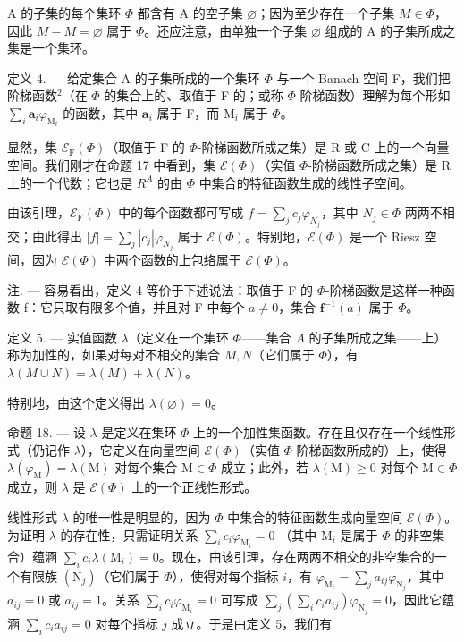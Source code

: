A 的子集的每个集环 \(\Phi\) 都含有 A 的空子集 \(\varnothing\)；因为至少存在一个子集 \(M \in \Phi\)，因此 \(M - M = \varnothing\) 属于 \(\Phi\)。还应注意，由单独一个子集 \(\varnothing\) 组成的 A 的子集所成之集是一个集环。

定义 4. --- 给定集合 A 的子集所成的一个集环 \(\Phi\) 与一个 Banach 空间 F，我们把阶梯函数\(^{2}\)（在 \(\Phi\) 的集合上的、取值于 F 的；或称 \(\Phi\)-阶梯函数）理解为每个形如 \(\sum_{i} \mathbf{a}_{i} \varphi_{\mathrm{M}_{i}}\) 的函数，其中 \(\mathbf{a}_{i}\) 属于 F，而 \(\mathrm{M}_{i}\) 属于 \(\Phi\)。

显然，集 \(\mathcal{E}_{\mathrm{F}}(\Phi)\)（取值于 F 的 \(\Phi\)-阶梯函数所成之集）是 R 或 C 上的一个向量空间。我们刚才在命题 17 中看到，集 \(\mathcal{E}(\Phi)\)（实值 \(\Phi\)-阶梯函数所成之集）是 R 上的一个代数；它也是 \(R^{A}\) 的由 \(\Phi\) 中集合的特征函数生成的线性子空间。

由该引理，\(\mathcal{E}_{\mathrm{F}}(\Phi)\) 中的每个函数都可写成 \(f = \sum_{j} c_{j} \varphi_{N_{j}}\)，其中 \(N_{j} \in \Phi\) 两两不相交；由此得出 \(|f| = \sum_{j} |c_{j}| \varphi_{N_{j}}\) 属于 \(\mathcal{E}(\Phi)\)。特别地，\(\mathcal{E}(\Phi)\) 是一个 Riesz 空间，因为 \(\mathcal{E}(\Phi)\) 中两个函数的上包络属于 \(\mathcal{E}(\Phi)\)。

注. --- 容易看出，定义 4 等价于下述说法：取值于 F 的 \(\Phi\)-阶梯函数是这样一种函数 f：它只取有限多个值，并且对 F 中每个 \(a \neq 0\)，集合 \(\mathbf{f}^{-1}(a)\) 属于 \(\Phi\)。

定义 5. --- 实值函数 \(\lambda\)（定义在一个集环 \(\Phi\)——集合 \(A\) 的子集所成之集——上）称为加性的，如果对每对不相交的集合 \(M, N\)（它们属于 \(\Phi\)），有 \(\lambda(M \cup N) = \lambda(M) + \lambda(N)\)。

特别地，由这个定义得出 \(\lambda(\varnothing)=0\)。

命题 18. --- 设 \(\lambda\) 是定义在集环 \(\Phi\) 上的一个加性集函数。存在且仅存在一个线性形式（仍记作 \(\lambda\)），它定义在向量空间 \(\mathcal{E}(\Phi)\)（实值 \(\Phi\)-阶梯函数所成的）上，使得 \(\lambda(\varphi_{\mathrm{M}}) = \lambda(\mathrm{M})\) 对每个集合 \(\mathrm{M} \in \Phi\) 成立；此外，若 \(\lambda(\mathrm{M}) \geqslant 0\) 对每个 \(\mathrm{M} \in \Phi\) 成立，则 \(\lambda\) 是 \(\mathcal{E}(\Phi)\) 上的一个正线性形式。

线性形式 \(\lambda\) 的唯一性是明显的，因为 \(\Phi\) 中集合的特征函数生成向量空间 \(\mathcal{E}(\Phi)\)。为证明 \(\lambda\) 的存在性，只需证明关系 \(\sum_{i} c_i \varphi_{\mathrm{M}_i} = 0\) （其中 \(\mathrm{M}_i\) 是属于 \(\Phi\) 的非空集合）蕴涵 \(\sum_{i} c_i \lambda(\mathrm{M}_i) = 0\)。现在，由该引理，存在两两不相交的非空集合的一个有限族 \((\mathrm{N}_j)\)（它们属于 \(\Phi\)），使得对每个指标 \(i\)，有 \(\varphi_{\mathrm{M}_i} = \sum_{j} a_{ij} \varphi_{\mathrm{N}_j}\)，其中 \(a_{ij} = 0\) 或 \(a_{ij} = 1\)。关系 \(\sum_{i} c_i \varphi_{\mathrm{M}_i} = 0\) 可写成 \(\sum_{j} \left( \sum_{i} c_i a_{ij} \right) \varphi_{\mathrm{N}_j} = 0\)，因此它蕴涵 \(\sum_{i} c_i a_{ij} = 0\) 对每个指标 \(j\) 成立。于是由定义 5，我们有

